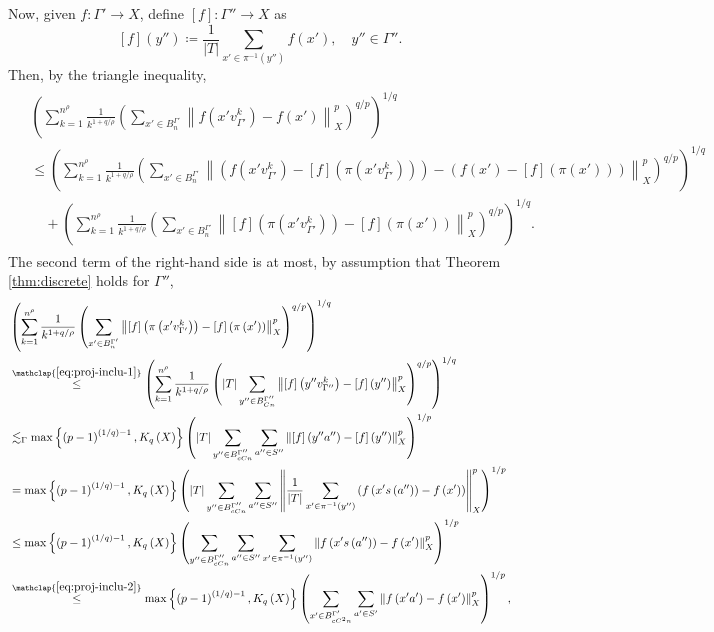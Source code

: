 \documentclass[11pt,reqno]{amsart}
\newcommand{\1}{\mathbf 1}
\begin{document}
Now, given $f:\Gamma'\to X$, define $\left[f\right]:\Gamma''\to X$ as
\[
\left[f\right]\left(y''\right)\coloneqq \frac{1}{\left|T\right|}\sum_{x'\in \pi^{-1}\left(y''\right)}f\left(x'\right),\quad y''\in \Gamma''.
\]
Then, by the triangle inequality,
\begin{align}\label{A-1}
\begin{aligned}
&\left(\sum_{k=1}^{n^\rho}\frac{1}{k^{1+q/\rho}}\left(\sum_{x'\in B^{\Gamma'}_n} \left\|f\left(x'v_{\Gamma'}^k\right)-f\left(x'\right)\right\|_X^p\right)^{q/p}\right)^{1/q}\\
&\le \left(\sum_{k=1}^{n^\rho}\frac{1}{k^{1+q/\rho}}\left(\sum_{x'\in B^{\Gamma'}_n} \left\|\left(f\left(x'v_{\Gamma'}^k\right)-\left[f\right]\left(\pi\left(x'v_{\Gamma'}^k\right)\right)\right)-\left(f\left(x'\right)-\left[f\right]\left(\pi\left(x'\right)\right)\right)\right\|_X^p\right)^{q/p}\right)^{1/q}\\
&\quad + \left(\sum_{k=1}^{n^\rho}\frac{1}{k^{1+q/\rho}}\left(\sum_{x'\in B^{\Gamma'}_n} \left\|\left[f\right]\left(\pi\left(x'v_{\Gamma'}^k\right)\right)-\left[f\right]\left(\pi\left(x'\right)\right)\right\|_X^p\right)^{q/p}\right)^{1/q}.
\end{aligned}
\end{align}
The second term of the right-hand side is at most, by assumption that Theorem \ref{thm:discrete} holds for $\Gamma''$,
\begin{align*}
&\left(\sum_{k=1}^{n^\rho}\frac{1}{k^{1+q/\rho}}\left(\sum_{x'\in B^{\Gamma'}_n} \left\|\left[f\right]\left(\pi\left(x'v_{\Gamma'}^k\right)\right)-\left[f\right]\left(\pi\left(x'\right)\right)\right\|_X^p\right)^{q/p}\right)^{1/q}\\
&\stackrel{\mathclap{\eqref{eq:proj-inclu-1}}}{\le} \left(\sum_{k=1}^{n^\rho}\frac{1}{k^{1+q/\rho}}\left(\left|T\right|\sum_{y''\in B^{\Gamma''}_{Cn}} \left\|\left[f\right]\left(y''v_{\Gamma''}^k\right)-\left[f\right]\left(y''\right)\right\|_X^p\right)^{q/p}\right)^{1/q}\\
&\lesssim_{\Gamma} \max\left\{\left(p-1\right)^{(1/q)-1},K_q\left(X\right)\right\} 
\left(|T|\sum_{y''\in B^{\Gamma''}_{cCn}} \sum_{a''\in S''}\left\|\left[f\right]\left(y''a''\right)-\left[f\right]\left(y''\right)\right\|^p_X\right)^{1/p}\\
&=\max\left\{\left(p-1\right)^{(1/q)-1},K_q\left(X\right)\right\} 
\left(|T|\sum_{y''\in B^{\Gamma''}_{cCn}} \sum_{a''\in S''}\left\|\frac{1}{\left|T\right|}\sum_{x'\in \pi^{-1}\left(y''\right)}\left(f\left(x's\left(a''\right)\right)-f\left(x'\right)\right)\right\|^p_X\right)^{1/p}\\
&\le\max\left\{\left(p-1\right)^{(1/q)-1},K_q\left(X\right)\right\} 
\left(\sum_{y''\in B^{\Gamma''}_{cCn}} \sum_{a''\in S''}\sum_{x'\in \pi^{-1}\left(y''\right)}\left\|f\left(x's\left(a''\right)\right)-f\left(x'\right)\right\|^p_X\right)^{1/p}\\
&\stackrel{\mathclap{\eqref{eq:proj-inclu-2}}}{\le} \max\left\{\left(p-1\right)^{(1/q)-1},K_q\left(X\right)\right\} 
\left(\sum_{x'\in B^{\Gamma'}_{cC^2n}} \sum_{a'\in S'}\left\|f\left(x'a'\right)-f\left(x'\right)\right\|^p_X\right)^{1/p},
\end{align*}
\end{document}
